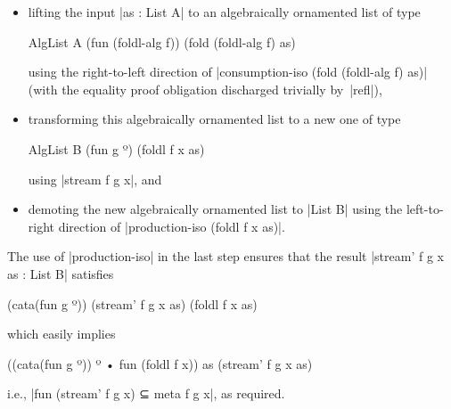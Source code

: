 \begin{itemize}
\item lifting the input |as : List A| to an algebraically ornamented list of type
\begin{code}
AlgList A (fun (foldl-alg f)) (fold (foldl-alg f) as)
\end{code}
using the right-to-left direction of |consumption-iso (fold (foldl-alg f) as)| (with the equality proof obligation discharged trivially by~|refl|),
\item transforming this algebraically ornamented list to a new one of type
\begin{code}
AlgList B (fun g º) (foldl f x as)
\end{code}
using |stream f g x|, and
\item demoting the new algebraically ornamented list to |List B| using the left-to-right direction of |production-iso (foldl f x as)|.
\end{itemize}
The use of |production-iso| in the last step ensures that the result |stream' f g x as : List B| satisfies
\begin{code}
(cata(fun g º)) (stream' f g x as) (foldl f x as)
\end{code}
which easily implies
\begin{code}
((cata(fun g º)) º • fun (foldl f x)) as (stream' f g x as)
\end{code}
i.e., |fun (stream' f g x) ⊆ meta f g x|, as required.

